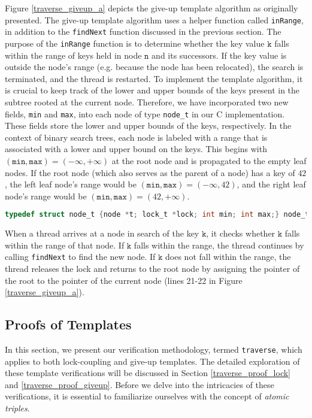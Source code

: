 \documentclass[a4paper,UKenglish,cleveref, autoref, thm-restate]{lipics-v2021}
\newcommand{\wm}[1]{\textbf{\textcolor{violet}{[Willam: #1]}}}
\begin{document}
Figure \ref{traverse_giveup_a} depicts the give-up template algorithm as originally presented. The give-up template algorithm uses a helper function called \lstinline{inRange}, in addition to the \lstinline{findNext} function discussed in the previous section. The purpose of the \lstinline{inRange} function is to determine whether the key value $\texttt{k}$ falls within the range of keys held in node $\texttt{n}$ and its successors. If the key value is outside the node's range (e.g. because the node has been relocated), the search is terminated, and the thread is restarted. To implement the template algorithm, it is crucial to keep track of the lower and upper bounds of the keys present in the subtree rooted at the current node. Therefore, we have incorporated two new fields, \lstinline{min} and \lstinline{max}, into each node of type \lstinline{node_t} in our C implementation. These fields store the lower and upper bounds of the keys, respectively. In the context of binary search trees, each node is labeled with a range that is associated with a lower and upper bound on the keys. This begins with $(\texttt{min}, \texttt{max}) = (-\infty, +\infty)$ at the root node and is propagated to the empty leaf nodes. If the root node (which also serves as the parent of a node) has a key of $42$, the left leaf node's range would be $(\texttt{min}, \texttt{max}) = (-\infty, 42)$, and the right leaf node's range would be $(\texttt{min}, \texttt{max}) = (42, +\infty)$.

\begin{lstlisting}[language = C, backgroundcolor=\color{white}, basicstyle=\ttfamily\footnotesize]
	typedef struct node_t {node *t; lock_t *lock; int min; int max;} node_t;
\end{lstlisting}



When a thread arrives at a node in search of the key $\texttt{k}$, it checks whether $\texttt{k}$ falls within the range of that node. If $\texttt{k}$ falls within the range, the thread continues by calling \lstinline{findNext} to find the new node. If $\texttt{k}$ does not fall within the range, the thread releases the lock and returns to the root node by assigning the pointer of the root to the pointer of the current node (lines 21-22 in Figure \ref{traverse_giveup_a}).

\subsection{Proofs of Templates} 
In this section, we present our verification methodology, termed \lstinline{traverse}, which applies to both lock-coupling and give-up templates. The detailed exploration of these template verifications will be discussed in Section \ref{traverse_proof_lock} and \ref{traverse_proof_giveup}. Before we delve into the intricacies of these verifications, it is essential to familiarize ourselves with the concept of \emph{atomic triples}.
\end{document}
